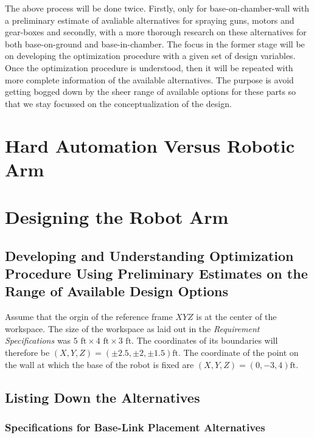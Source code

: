 \documentclass[a4paper,10pt]{article}
\begin{document}
The above process will be done twice. Firstly, only for base-on-chamber-wall with a preliminary estimate of avaliable alternatives for spraying guns, motors and gear-boxes and secondly, with a more thorough
research on these alternatives for both base-on-ground and base-in-chamber. The focus in the former stage will be on developing the optimization procedure with a given set of design variables. Once the optimization
procedure is understood, then it will be repeated with more complete information of the available alternatives. The purpose is avoid getting bogged down by the sheer range of available options for these parts so that we stay focussed on the conceptualization of the design.


\section{Hard Automation Versus Robotic Arm}

\section{Designing the Robot Arm}

\subsection{Developing and Understanding Optimization Procedure Using Preliminary Estimates on the Range of Available Design Options}
Assume that the orgin of the reference frame $XYZ$ is at the center of the workspace. The size of the workspace as laid out in the \emph{Requirement Specifications} was
$5\text{ ft}\times 4\text{ ft}\times 3\text{ ft}$. The coordinates of its boundaries will therefore be $(X,Y,Z)=(\pm2.5,\pm2,\pm1.5)\text{ft}$. The coordinate of the 
point on the wall at which the base of the robot is fixed are $(X,Y,Z)=(0,-3,4)\text{ft}$. 

\subsection{Listing Down the Alternatives}

\subsubsection{Specifications for Base-Link Placement Alternatives}
\end{document}
